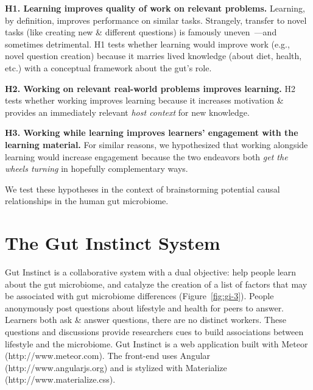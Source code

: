 \textbf{H1. Learning improves quality of work on relevant problems.}
Learning, by definition, improves performance on similar tasks. Strangely, transfer to novel tasks (like creating new \& different questions) is famously uneven~\cite{Boden2004}---and sometimes detrimental. H1 tests whether learning would improve work (e.g., novel question creation) because it marries lived knowledge (about diet, health, etc.) with a conceptual framework about the gut’s role.

\textbf{H2. Working on relevant real-world problems improves learning.}
H2 tests whether working improves learning because it increases motivation \& provides an immediately relevant \textit{host context} for new knowledge.
 
\textbf{H3. Working while learning improves learners’ engagement with the learning material.} 
For similar reasons, we hypothesized that working alongside learning would increase engagement because the two endeavors both \textit{get the wheels turning} in hopefully complementary ways.

We test these hypotheses in the context of brainstorming potential causal relationships in the human gut microbiome. 

\section{The Gut Instinct System}
Gut Instinct is a collaborative system with a dual objective: help people learn about the gut microbiome, and catalyze the creation of a list of factors that may be associated with gut microbiome differences (Figure~\ref{fig:gi-3}). People anonymously post questions about lifestyle and health for peers to answer. Learners both ask \& answer questions, there are
no distinct workers. These questions and discussions provide researchers cues to build associations between lifestyle and the microbiome.
Gut Instinct is a web application built with Meteor (http://www.meteor.com). The front-end uses Angular (http://www.angularjs.org) and is stylized with Materialize (http://www.materialize.css).

